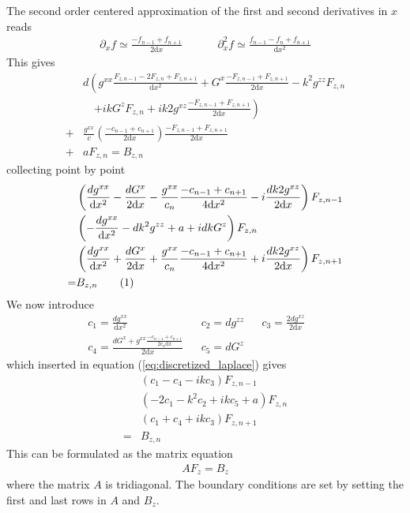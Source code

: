 \documentclass[12pt]{article}
\def\L{\left}
\def\R{\right}
\newcommand\numberthis{\addtocounter{equation}{1}\tag{\theequation}}
\begin{document}
The second order centered approximation of the first and second derivatives in
$x$ reads
%
\begin{align*}
    &&\partial_x f \simeq \frac{-f_{n-1} + f_{n+1}}{2\text{d}x}&&
    &&\partial_x^2 f \simeq \frac{f_{n-1} - f_{n} + f_{n+1}}{\text{d}x^2}&&
\end{align*}
%
This gives
%
\begin{align*}
    \, &d
    \L(    g^{xx} \frac{F_{z,n-1} - 2F_{z,n} + F_{z, n+1}}{\text{d}x^2}
         + G^x \frac{-F_{z,n-1} + F_{z,n+1}}{2\text{d}x}
         - k^2 g^{zz}F_{z,n}
         \R.\\
         &\quad\L.
         + i kG^zF_{z,n}
         + i k2g^{xz} \frac{-F_{z,n-1} + F_{z,n+1}}{2\text{d}x}
    \R)
    \\
%
    +& \frac{g^{xx}}{c}
    \L(
        \frac{-c_{n-1} + c_{n+1}}{2\text{d}x}
    \R)
     \frac{-F_{z,n-1} + F_{z,n+1}}{2\text{d}x}
       \\
%
    +& aF_{z,n} = B_{z,n}
\end{align*}
%
collecting point by point
%
\begin{align*}
    &\L(
          \frac{dg^{xx}}{\text{d}x^2}
        - \frac{dG^x}{2\text{d}x}
        - \frac{g^{xx}}{c_{n}}
          \frac{-c_{n-1} + c_{n+1}}{4\text{d}x^2}
        - i\frac{d k2g^{xz}}{2\text{d}x}
    \R)
    F_{z,n-1}
    \\
    &\L(
       - \frac{ dg^{xx} }{\text{d}x^2}
       - dk^2 g^{zz}
       + a
       + idkG^z
    \R)
    F_{z,n}
    \\
    &\L(
          \frac{dg^{xx}}{\text{d}x^2}
        + \frac{dG^x}{2\text{d}x}
        + \frac{g^{xx}}{c_{n}}
          \frac{-c_{n-1} + c_{n+1}}{4\text{d}x^2}
        + i\frac{dk2g^{xz}}{2\text{d}x}
    \R)
    F_{z, n+1}
    \\
%
     =& B_{z,n}
    \numberthis
    \label{eq:discretized_laplace}
\end{align*}
%
We now introduce
%
\begin{align*}
    &c_1 = \frac{dg^{xx}}{\text{d}x^2}&
    &c_2 = dg^{zz}&
    &c_3 = \frac{2dg^{xz}}{2\text{d}x}& &&
    \\
    &c_4 = \frac{dG^x + g^{xx}\frac{-c_{n-1} + c_{n+1}}{2c_n\text{d}x}}{2\text{d}x}&
    &c_5 = dG^z&
    &&
\end{align*}
%
which inserted in equation (\ref{eq:discretized_laplace}) gives
%
\begin{align*}
    &\L(
        c_1 - c_4
        -ikc_3
    \R)
    F_{z,n-1}
    \\
    &\L(
       -2c_1 - k^2c_2
       +ikc_5
       + a
    \R)
    F_{z,n}
    \\
    &\L(
        c_1 + c_4
        + ikc_3
    \R)
    F_{z, n+1}
    \\
%
     =& B_{z,n}
\end{align*}
%
This can be formulated as the matrix equation
%
\begin{align*}
    AF_z=B_z
\end{align*}
%
where the matrix $A$ is tridiagonal. The boundary conditions are set by
setting the first and last rows in $A$ and $B_z$.
%
\end{document}
